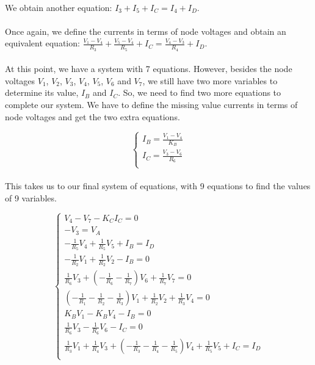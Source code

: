 \paragraph{}
We obtain another equation: $ I_3 + I_5 + I_C = I_4 + I_D $.

\paragraph{}
Once again, we define the currents in terms of node voltages and obtain an equivalent equation: $ \frac{V_1-V_4}{R_3}+\frac{V_5-V_4}{R_5}+I_C = \frac{V_4-V_3}{R_4} + I_D $.

\paragraph{}
At this point, we have a system with 7 equations. However, besides the node voltages $V_1$, $V_2$, $V_3$, $V_4$, $V_5$, $V_6$ and $V_7$, we still have two more variables to determine its value, $I_B$ and $I_C$. So, we need to find two more equations to complete our system. We have to define the missing value currents in terms of node voltages and get the two extra equations.

\[
\left\{\begin{matrix}
I_B = \frac{V_1-V_4}{K_B} \\
I_C = \frac{V_3-V_6}{R_6} \\
\end{matrix}\right.
\]

\paragraph{}
This takes us to our final system of equations, with 9 equations to find the values of 9 variables.

\[
\left\{\begin{matrix}
V_{4} - V_{7} -K_{C}I_{C}=0\\

-V_{3}=V_{A}\\ 

-\frac{1}{R_{5}}V_{4}+\frac{1}{R_{5}}V_{5}+I_{B}=I_D\\

-\frac{1}{R_{2}}V_{1}+\frac{1}{R_{2}}V_{2}-I_{B}=0\\ 

\frac{1}{R_{6}}V_{3}+(-\frac{1}{R_{6}}-\frac{1}{R_{7}})V_{6}+\frac{1}{R_{7}}V_{7}=0\\ 

(-\frac{1}{R_{1}}-\frac{1}{R_{2}}-\frac{1}{R_{3}})V_{1} + \frac{1}{R_{2}}V_{2}+\frac{1}{R_{3}}V_{4}=0\\

K_{B}V_{1}-K_{B}V_{4}-I_{B}=0\\

\frac{1}{R_{6}}V_{3}-\frac{1}{R_{6}}V_{6}-I_{C}=0\\ 

\frac{1}{R_{3}}V_{1}+\frac{1}{R_{4}}V_{3}+(-\frac{1}{R_{3}}-\frac{1}{R_{4}}-\frac{1}{R_{5}})V_{4}+\frac{1}{R_{5}}V_{5}+I_C = I_D\\

\end{matrix}\right.
\]

